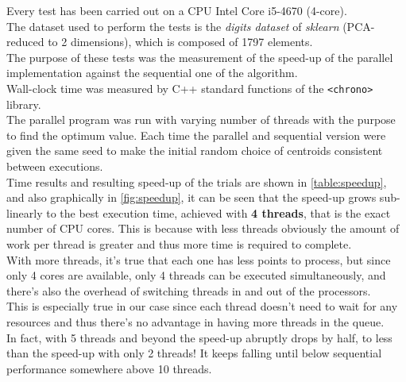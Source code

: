 \documentclass[10pt,twocolumn,letterpaper]{article}
\begin{document}
Every test has been carried out on a CPU Intel Core i5-4670 (4-core).\\
The dataset used to perform the tests is the \textit{digits dataset} of \textit{sklearn} (PCA-reduced to 2 dimensions), which is composed of 1797 elements.\\
The purpose of these tests was the measurement of the speed-up of the parallel implementation against the sequential one of the algorithm.\\
Wall-clock time was measured by C++ standard functions of the \texttt{<chrono>} library.\\
The parallel program was run with varying number of threads with the purpose to find the optimum value. Each time the parallel and sequential version were given the same seed to make the initial random choice of centroids consistent between executions.\\
Time results and resulting speed-up of the trials are shown in \cref{table:speedup}, and also graphically in \cref{fig:speedup}, it can be seen that the speed-up grows sub-linearly to the best execution time, achieved with \textbf{4 threads}, that is the exact number of CPU cores. This is because with less threads obviously the amount of work per thread is greater and thus more time is required to complete.\\ With more threads, it's true that each one has less points to process, but since only 4 cores are available, only 4 threads can be executed simultaneously, and there's also the overhead of switching threads in and out of the processors.\\
This is especially true in our case since each thread doesn't need to wait for any resources and thus there's no advantage in having more threads in the queue.\\
In fact, with 5 threads and beyond the speed-up abruptly drops by half, to less than the speed-up with only 2 threads! It keeps falling until below sequential performance somewhere above 10 threads.
\end{document}
